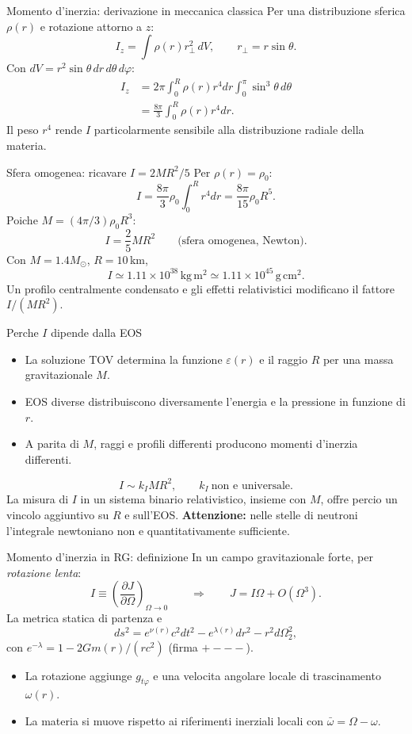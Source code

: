 \begin{frame}[t]{Momento d'inerzia: derivazione in meccanica classica}
\small
Per una distribuzione sferica $\rho(r)$ e rotazione attorno a $z$:
\[
I_z=\int \rho(r)r_\perp^2\,dV,
\qquad r_\perp=r\sin\theta.
\]
Con $dV=r^2\sin\theta\,dr\,d\theta\,d\varphi$:
\[
\begin{aligned}
I_z&=2\pi\int_0^R\rho(r)r^4dr
\int_0^\pi\sin^3\theta\,d\theta\\
&=\frac{8\pi}{3}\int_0^R\rho(r)r^4dr.
\end{aligned}
\]
Il peso $r^4$ rende $I$ particolarmente sensibile alla distribuzione radiale della materia.
\end{frame}

\begin{frame}[t]{Sfera omogenea: ricavare $I=2MR^2/5$}
\small
Per $\rho(r)=\rho_0$:
\[
I=\frac{8\pi}{3}\rho_0\int_0^Rr^4dr
=\frac{8\pi}{15}\rho_0R^5.
\]
Poiche $M=(4\pi/3)\rho_0R^3$:
\[
I=\frac25 MR^2\qquad\text{(sfera omogenea, Newton)}.
\]
Con $M=1.4M_\odot$, $R=10\,$km,
\[
I\simeq1.11\times10^{38}\,\mathrm{kg\,m^2}
\simeq1.11\times10^{45}\,\mathrm{g\,cm^2}.
\]
Un profilo centralmente condensato e gli effetti relativistici modificano il fattore $I/(MR^2)$.
\end{frame}

\begin{frame}[t]{Perche $I$ dipende dalla EOS}
\small
\begin{itemize}
\item La soluzione TOV determina la funzione $\varepsilon(r)$ e il raggio $R$ per una massa gravitazionale $M$.
\item EOS diverse distribuiscono diversamente l'energia e la pressione in funzione di $r$.
\item A parita di $M$, raggi e profili differenti producono momenti d'inerzia differenti.
\end{itemize}
\[
I\sim k_I MR^2,\qquad k_I\ \text{non e universale}.
\]
La misura di $I$ in un sistema binario relativistico, insieme con $M$, offre percio un vincolo aggiuntivo su $R$ e sull'EOS.
\medskip
\textbf{Attenzione:} nelle stelle di neutroni l'integrale newtoniano non e quantitativamente sufficiente.
\end{frame}

\begin{frame}[t]{Momento d'inerzia in RG: definizione}
\small
In un campo gravitazionale forte, per \emph{rotazione lenta}:
\[
I\equiv\left(\frac{\partial J}{\partial\Omega}\right)_{\Omega\to0}
\qquad\Rightarrow\qquad J=I\Omega+O(\Omega^3).
\]
La metrica statica di partenza e
\[
ds^2=e^{\nu(r)}c^2dt^2-e^{\lambda(r)}dr^2-r^2d\Omega_2^2,
\]
con $e^{-\lambda}=1-2Gm(r)/(rc^2)$ (firma $+---$).
\begin{itemize}
\item La rotazione aggiunge $g_{t\varphi}$ e una velocita angolare locale di trascinamento $\omega(r)$.
\item La materia si muove rispetto ai riferimenti inerziali locali con $\bar\omega=\Omega-\omega$.
\end{itemize}
\end{frame}

